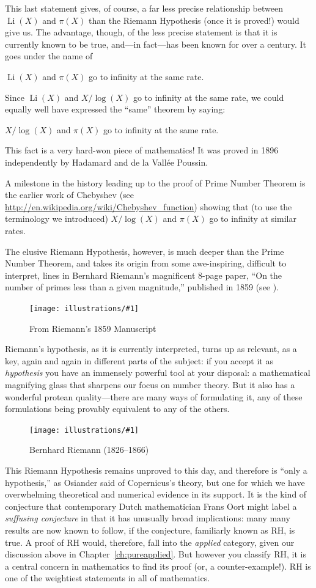 \documentclass[openany]{book}
\DeclareMathOperator{\Li}{Li}
\newcommand{\ill}[3]{%
   \begin{figure}[H]%
   \vspace{-2ex}
   \centering%
   \texttt{[image: illustrations/\#1]}%
   \caption{#3}%
   \vspace{-2ex}
    \end{figure}}
\theoremstyle{plain}
\theoremstyle{definition}
\newcommand{\RH}{Riemann Hypothesis\index{Riemann Hypothesis}}
\begin{document}
{{This last statement gives, of course, a far less precise relationship
between $\Li(X)$ and $\pi(X)$ than the \RH{} (once it is proved!)
would give us.  The advantage, though, of the less precise statement
is that it is currently known to be true, and---in fact---has been
known for over a century. It goes under the name of


  $\Li(X)$ and $\pi(X)$ go to infinity at the same rate.


   Since $\Li(X)$ and $X/\log(X)$ go to infinity at the same rate, we could
   equally well have expressed the ``same'' theorem by saying:


   $X/\log(X)$ and $\pi(X)$ go to infinity at the same rate.


   This fact is a very hard-won piece of mathematics!  It was proved
   in 1896 independently by Hadamard and de la Vall\'{e}e Poussin.


   A milestone in the history leading up to the proof of Prime Number
   Theorem is the earlier work of Chebyshev (see
   \url{http://en.wikipedia.org/wiki/Chebyshev_function}) showing that
   (to use the terminology we introduced) $X/\log(X)$ and $\pi(X)$ go
   to infinity at similar rates.


The elusive \RH{}, however, is much deeper than the Prime
Number Theorem, and takes its origin from some awe-inspiring,
difficult to interpret, lines in Bernhard Riemann's magnificent 8-page
paper, ``On the number of primes less than a given magnitude,''
published in 1859
(see ).


\ill{riemann_zoom}{1}{From Riemann's 1859 Manuscript\label{fig:riemamn}}




Riemann's hypothesis, as it is currently interpreted, turns up as
relevant, as a key, again and again in different parts of the subject:
if you accept it as {\em hypothesis} you have an immensely powerful
tool at your disposal: a mathematical magnifying glass that sharpens
our focus on number theory. But it also has a wonderful protean
quality---there are many ways of formulating it, any of these
formulations being provably equivalent to any of the others.

\ill{riemann}{.3}{Bernhard Riemann (1826--1866)}


This \RH{} remains unproved to this day, and therefore is ``only a
hypothesis,'' as Osiander said of Copernicus's theory, but one for
which we have overwhelming theoretical and numerical evidence in its
support.  It is the kind of conjecture that contemporary Dutch
mathematician Frans Oort might label a {\em suffusing conjecture} in
that it has unusually broad implications: many many results are now
known to follow, if the conjecture, familiarly known as RH, is true.
A proof of RH would, therefore, fall into the {\em applied} category,
given our discussion above in Chapter~\ref{ch:pureapplied}.  But
however you classify RH, it is a central concern in mathematics to
find its proof (or, a counter-example!).  RH is one of the weightiest
statements in all of mathematics.


}}
\end{document}
